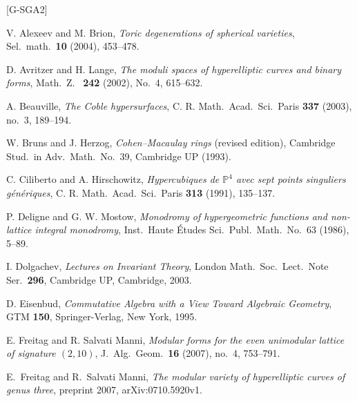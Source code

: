 \documentclass{amsart}
\theoremstyle{definition}
\theoremstyle{remark}
\def\proj{\mathbb{P}}
\begin{document}
\begin{thebibliography}{[G-SGA2]}

 V. Alexeev and M. Brion, {\em Toric degenerations of
    spherical varieties}, Sel.\ math.\ {\bf 10} (2004), 453--478.

 D. Avritzer and H. Lange, {\em The moduli
spaces of hyperelliptic curves and binary forms}, Math.\ Z.\ {\bf
242} (2002), No.\ 4, 615--632.

  A. Beauville, {\em The Coble hypersurfaces},
C. R. Math.\ Acad.\ Sci.\ Paris {\bf 337} (2003), no.\ 3, 189--194.

 W. Bruns and J. Herzog, {\em Cohen--Macaulay
rings} (revised edition), Cambridge Stud.\ in Adv.\ Math.\ No.\ 39,
Cambridge UP (1993).

 C. Ciliberto and A. Hirschowitz, {\em Hypercubiques
    de $\proj^4$ avec sept points singuliers g\'en\'eriques}, 
C. R. Math.\ Acad.\ Sci.\ Paris {\bf 313} (1991), 135--137.

 P. Deligne and G. W. Mostow, {\em Monodromy of
hypergeometric functions and non-lattice integral monodromy}, Inst.\
Haute \'Etudes Sci.\ Publ.\ Math.\ No.\ 63 (1986), 5--89.

 I. Dolgachev, {\em Lectures on Invariant
    Theory},
London Math.\ Soc.\ Lect.\ Note Ser.\ {\bf 296}, Cambridge UP,
Cambridge, 2003.


 D. Eisenbud, {\em Commutative Algebra with a View Toward
    Algebraic Geometry},   GTM {\bf 150}, Springer-Verlag, New York, 1995.

 E. Freitag and R. Salvati Manni, {\em Modular
forms for the even unimodular lattice of signature $(2,10)$}, J.\
Alg.\ Geom.\ {\bf 16} (2007), no.\ 4, 753--791.

 E.\ Freitag and R.\ Salvati Manni, {\em The modular
variety of hyperelliptic curves of genus three}, preprint 2007, arXiv:0710.5920v1.



\end{thebibliography}
\end{document}
